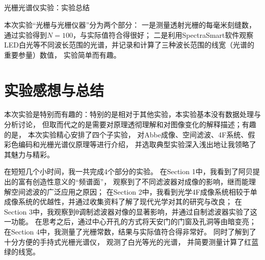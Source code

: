 \documentclass[11pt]{article}
\begin{document}
\subsection[光栅光谱仪实验：实验总结 ]{}

\begin{center}
    \begin{tcolorbox}[colback=gray!10,%
                      colframe=black,%
                      width=6cm,%
                      arc=1mm, auto outer arc,
                      boxrule=0.5pt,
                     ]
                     \begin{center}
                    光栅光谱仪实验：实验总结      
                     \end{center}
    \end{tcolorbox}
\end{center}

本次实验“光栅与光栅仪器”分为两个部分：
一是测量透射光栅的每毫米刻缝数，通过实验得到$N=100$，与实际值符合得很好；
二是利用SpectraSmart软件观察LED白光等不同波长范围的光谱，并记录和计算了三种波长范围的线宽（光谱的重要参量）数值，
实验简单而有趣。

























\section{实验感想与总结}

本次实验是特别而有趣的：特别的是相对于其他实验，本实验基本没有数据处理与分析讨论，
但取而代之的是需要对原理透彻理解和对图像变化的解释描述；有趣的是，
本次实验精心安排了四个子实验，
对Abbe成像、空间滤波、4F系统、假彩色编码和光栅光谱仪原理等进行介绍，
并选取典型实验深入浅出地让我领略了其魅力与精彩。

在短短几个小时间，我一共完成4个部分的实验。
在Section 1中，我看到了阿贝提出的富有创造性意义的“频谱面”，
观察到了不同滤波器对成像的影响，继而能理解空间滤波的广泛应用之原因；
在Section 2中，我看到光学4F成像系统相较于单成像系统的优越性，并通过收集资料了解了现代光学对其的研究与改良；
在Section 3中，我观察到θ调制滤波器对像的显著影响，并通过自制滤波器实验了这一功能。
在思考之后，通过中心开孔的方式将天安门的门窗及孔洞等由暗变亮；
在Section 4中，我测量了光栅常数，结果与实际值符合得非常好。
同时了解到了十分方便的手持式光栅光谱仪，
观测了白光等光的光谱，
并简要测量计算了红蓝绿的线宽。
\end{document}
